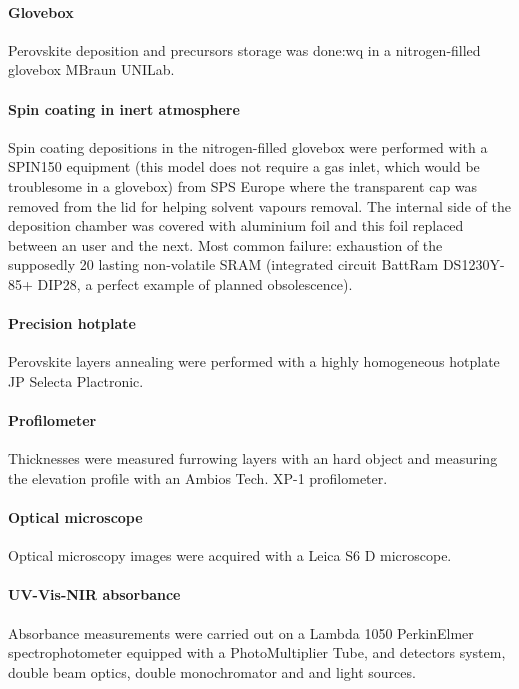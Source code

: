 	\paragraph{Glovebox} Perovskite deposition and precursors storage was done:wq in a nitrogen-filled glovebox MBraun UNILab.

	\paragraph{Spin coating in inert atmosphere} Spin coating depositions in the nitrogen-filled glovebox were performed with a SPIN150 equipment (this model does not require a gas inlet, which would be troublesome in a glovebox) from SPS Europe where the transparent cap was removed from the lid for helping solvent vapours removal. The internal side of the deposition chamber was covered with aluminium foil and this foil replaced between an user and the next. Most common failure: exhaustion of the supposedly \SI{20}{\year} lasting non-volatile SRAM (integrated circuit BattRam DS1230Y-85+ DIP28, a perfect example of planned obsolescence).

	\paragraph{Precision hotplate} Perovskite layers annealing were performed with a highly homogeneous hotplate JP Selecta Plactronic.

	\paragraph{Profilometer} Thicknesses were measured furrowing layers with an hard object and measuring the elevation profile with an Ambios Tech. XP-1 profilometer.

	\paragraph{Optical microscope} Optical microscopy images were acquired with a Leica S6 D microscope.
	
	\paragraph{UV-Vis-NIR absorbance} Absorbance measurements were carried out on a Lambda 1050 PerkinElmer spectrophotometer equipped with a PhotoMultiplier Tube,  and  detectors system, double beam optics, double monochromator and  and  light sources.
	
